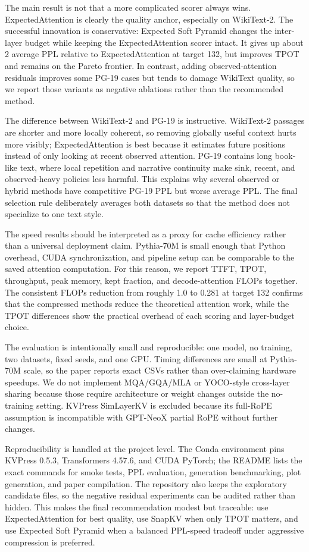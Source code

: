 \documentclass{article}
\begin{document}
The main result is not that a more complicated scorer always wins. ExpectedAttention is clearly the quality anchor, especially on WikiText-2. The successful innovation is conservative: Expected Soft Pyramid changes the inter-layer budget while keeping the ExpectedAttention scorer intact. It gives up about 2 average PPL relative to ExpectedAttention at target 132, but improves TPOT and remains on the Pareto frontier. In contrast, adding observed-attention residuals improves some PG-19 cases but tends to damage WikiText quality, so we report those variants as negative ablations rather than the recommended method.

The difference between WikiText-2 and PG-19 is instructive. WikiText-2 passages are shorter and more locally coherent, so removing globally useful context hurts more visibly; ExpectedAttention is best because it estimates future positions instead of only looking at recent observed attention. PG-19 contains long book-like text, where local repetition and narrative continuity make sink, recent, and observed-heavy policies less harmful. This explains why several observed or hybrid methods have competitive PG-19 PPL but worse average PPL. The final selection rule deliberately averages both datasets so that the method does not specialize to one text style.

The speed results should be interpreted as a proxy for cache efficiency rather than a universal deployment claim. Pythia-70M is small enough that Python overhead, CUDA synchronization, and pipeline setup can be comparable to the saved attention computation. For this reason, we report TTFT, TPOT, throughput, peak memory, kept fraction, and decode-attention FLOPs together. The consistent FLOPs reduction from roughly 1.0 to 0.281 at target 132 confirms that the compressed methods reduce the theoretical attention work, while the TPOT differences show the practical overhead of each scoring and layer-budget choice.

The evaluation is intentionally small and reproducible: one model, no training, two datasets, fixed seeds, and one GPU. Timing differences are small at Pythia-70M scale, so the paper reports exact CSVs rather than over-claiming hardware speedups. We do not implement MQA/GQA/MLA or YOCO-style cross-layer sharing because those require architecture or weight changes outside the no-training setting. KVPress SimLayerKV is excluded because its full-RoPE assumption is incompatible with GPT-NeoX partial RoPE without further changes.

Reproducibility is handled at the project level. The Conda environment pins KVPress 0.5.3, Transformers 4.57.6, and CUDA PyTorch; the README lists the exact commands for smoke tests, PPL evaluation, generation benchmarking, plot generation, and paper compilation. The repository also keeps the exploratory candidate files, so the negative residual experiments can be audited rather than hidden. This makes the final recommendation modest but traceable: use ExpectedAttention for best quality, use SnapKV when only TPOT matters, and use Expected Soft Pyramid when a balanced PPL-speed tradeoff under aggressive compression is preferred.
\end{document}

